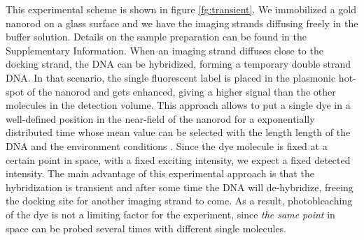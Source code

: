 This experimental scheme is shown in figure \ref{fg:transient}. We immobilized a gold nanorod on a glass surface and we have the imaging strands diffusing freely in the buffer solution. Details on the sample preparation can be found in the Supplementary Information.
When an imaging strand diffuses close to the docking strand, the DNA can be hybridized, forming a temporary double strand DNA. In that scenario, the single fluorescent label is placed in the plasmonic hot-spot of the nanorod and gets enhanced, giving a higher signal than the other molecules in the detection volume. 
This approach allows to put a single dye in a well-defined position in the near-field of the nanorod for a exponentially distributed time
whose mean value can be selected with the length length of the DNA and the environment conditions \cite{}. Since the dye molecule is fixed at a certain point in space, with a fixed exciting intensity, we expect a fixed detected intensity. The main advantage of this experimental approach is that the hybridization is transient and after some time the DNA will de-hybridize, freeing the docking site for another imaging strand to come. As a result, photobleaching of the dye is not a limiting factor for the experiment, since \textit{the same point} in space can be probed several times with different single molecules.


